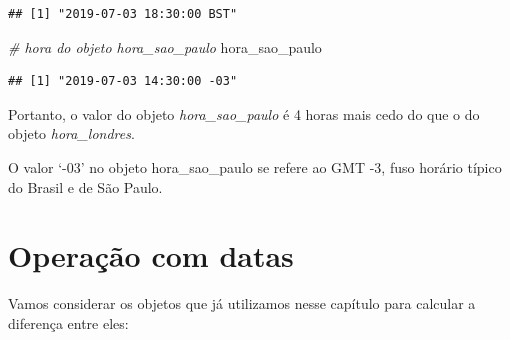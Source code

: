 \documentclass[
]{book}
\newenvironment{Shaded}{\begin{snugshade}}{\end{snugshade}}
\newcommand{\CommentTok}[1]{\textcolor[rgb]{0.56,0.35,0.01}{\textit{#1}}}
\newcommand{\DataTypeTok}[1]{\textcolor[rgb]{0.13,0.29,0.53}{#1}}
\newcommand{\KeywordTok}[1]{\textcolor[rgb]{0.13,0.29,0.53}{\textbf{#1}}}
\newcommand{\NormalTok}[1]{#1}
\newcommand{\OperatorTok}[1]{\textcolor[rgb]{0.81,0.36,0.00}{\textbf{#1}}}
\newcommand{\StringTok}[1]{\textcolor[rgb]{0.31,0.60,0.02}{#1}}
\begin{document}
\begin{Shaded}
\end{Shaded}

\begin{verbatim}
## [1] "2019-07-03 18:30:00 BST"
\end{verbatim}

\begin{Shaded}
\begin{Highlighting}[]
\CommentTok{# hora do objeto hora_sao_paulo}
\NormalTok{hora_sao_paulo  }
\end{Highlighting}
\end{Shaded}

\begin{verbatim}
## [1] "2019-07-03 14:30:00 -03"
\end{verbatim}

Portanto, o valor do objeto \emph{hora\_sao\_paulo} é 4 horas mais cedo
do que o do objeto \emph{hora\_londres}.

O valor `-03' no objeto hora\_sao\_paulo se refere ao GMT -3, fuso
horário típico do Brasil e de São Paulo.

\hypertarget{operauxe7uxe3o-com-datas}{%
\section{Operação com datas}\label{operauxe7uxe3o-com-datas}}

Vamos considerar os objetos que já utilizamos nesse capítulo para
calcular a diferença entre eles:
\end{document}
